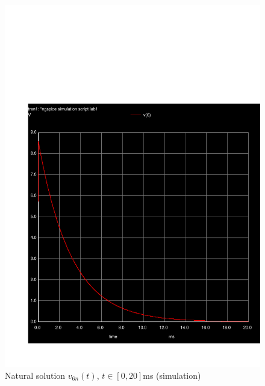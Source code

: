 \begin{figure}[h] \centering
\includegraphics[width=0.7\linewidth]{../sim/teste_3.pdf}
\caption{Natural solution $v_{6n}(t)$, $t\in[0,20]$ms (simulation)}
\label{fig:snat_sim}
\end{figure}
